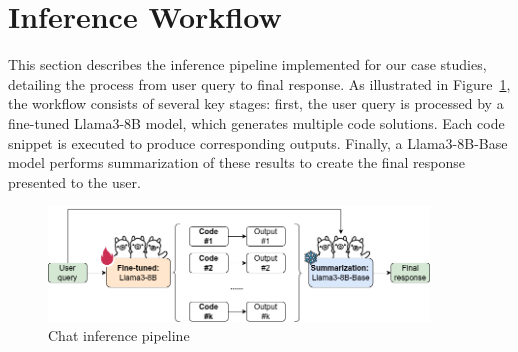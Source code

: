 




\section{Inference Workflow}

This section describes the inference pipeline implemented for our case studies, detailing the process from user query to final response. As illustrated in Figure~\ref{fig:inference_pipeline}, the workflow consists of several key stages: first, the user query is processed by a fine-tuned Llama3-8B model, which generates multiple code solutions. Each code snippet is executed to produce corresponding outputs. Finally, a Llama3-8B-Base model performs summarization of these results to create the final response presented to the user.

\begin{figure}[H]
  \centering
  \includegraphics[width=0.9\textwidth]{images/inference_pipeline.drawio.png}
  \caption{Chat inference pipeline}
  \label{fig:inference_pipeline}
\end{figure}

